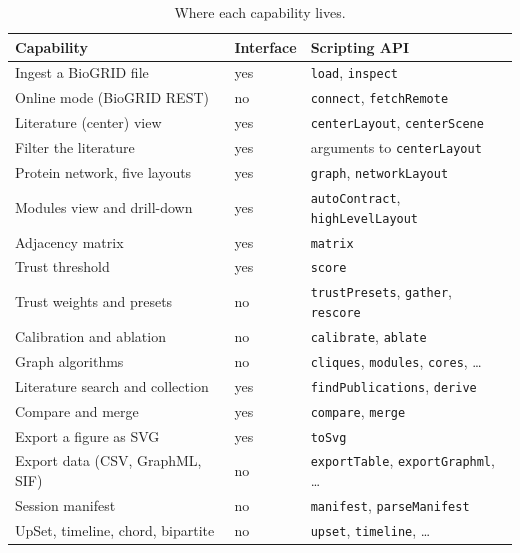 \documentclass[11pt,a4paper]{article}
\begin{document}
\begin{table}[h]
  \centering
  \small
  \caption{Where each capability lives.}
  \label{tab:surfaces}
  \begin{tabular}{lll}
    \toprule
    Capability & Interface & Scripting API \\
    \midrule
    Ingest a BioGRID file            & yes & \texttt{load}, \texttt{inspect} \\
    Online mode (BioGRID REST)       & no  & \texttt{connect}, \texttt{fetchRemote} \\
    Literature (center) view         & yes & \texttt{centerLayout}, \texttt{centerScene} \\
    Filter the literature            & yes & arguments to \texttt{centerLayout} \\
    Protein network, five layouts    & yes & \texttt{graph}, \texttt{networkLayout} \\
    Modules view and drill-down      & yes & \texttt{autoContract}, \texttt{highLevelLayout} \\
    Adjacency matrix                 & yes & \texttt{matrix} \\
    Trust threshold                  & yes & \texttt{score} \\
    Trust weights and presets        & no  & \texttt{trustPresets}, \texttt{gather}, \texttt{rescore} \\
    Calibration and ablation         & no  & \texttt{calibrate}, \texttt{ablate} \\
    Graph algorithms                 & no  & \texttt{cliques}, \texttt{modules}, \texttt{cores}, \dots \\
    Literature search and collection & yes & \texttt{findPublications}, \texttt{derive} \\
    Compare and merge                & yes & \texttt{compare}, \texttt{merge} \\
    Export a figure as SVG           & yes & \texttt{toSvg} \\
    Export data (CSV, GraphML, SIF)  & no  & \texttt{exportTable}, \texttt{exportGraphml}, \dots \\
    Session manifest                 & no  & \texttt{manifest}, \texttt{parseManifest} \\
    UpSet, timeline, chord, bipartite & no & \texttt{upset}, \texttt{timeline}, \dots \\
    \bottomrule
  \end{tabular}
\end{table}
\end{document}

